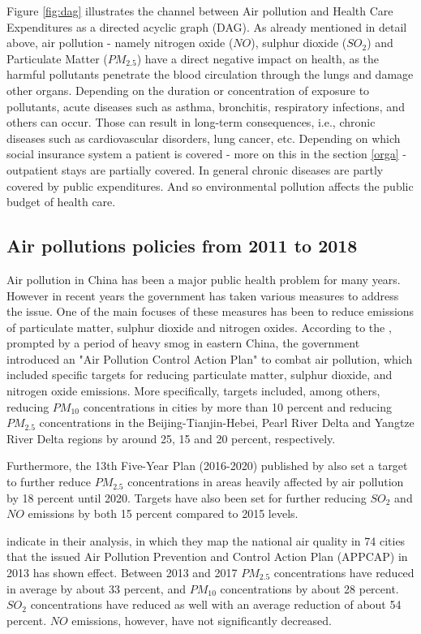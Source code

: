 \documentclass[
]{article}
\begin{document}
Figure \ref{fig:dag} illustrates the channel between Air pollution and Health Care Expenditures as a directed acyclic graph (DAG). As already mentioned in detail above, air pollution - namely nitrogen oxide ($NO$), sulphur dioxide ($SO_2$) and Particulate Matter ($PM_{2.5}$) have a direct negative impact on health, as the harmful pollutants penetrate the blood circulation through the lungs and damage other organs. Depending on the duration or concentration of exposure to pollutants, acute diseases such as asthma, bronchitis, respiratory infections, and others can occur. Those can result in long-term consequences, i.e., chronic diseases such as cardiovascular disorders, lung cancer, etc.  
Depending on which social insurance system a patient is covered - more on this in the section \ref{orga} - outpatient stays are partially covered. In general chronic diseases are partly covered by public expenditures. And so environmental pollution affects the public budget of health care. 
	
	
	\subsection{Air pollutions policies from 2011 to 2018}
	
	Air pollution in China has been a major public health problem for many years. However in recent years the government has taken various measures to address the issue. One of the main focuses of these measures has been to reduce emissions of particulate matter, sulphur dioxide and nitrogen oxides. 
	According to the \cite{china2013}, prompted by a period of heavy smog in eastern China, the government introduced an "Air Pollution Control Action Plan" to combat air pollution, which included specific targets for reducing particulate matter, sulphur dioxide, and nitrogen oxide emissions. More specifically, targets included, among others, reducing $PM_{10}$ concentrations in cities by more than 10 percent and reducing $PM_{2.5}$ concentrations in the Beijing-Tianjin-Hebei, Pearl River Delta and Yangtze River Delta regions by  around 25, 15 and 20 percent, respectively. 
	
	Furthermore, the 13th Five-Year Plan (2016-2020) published by \cite{china2016} also set a target to further reduce $PM_{2.5}$ concentrations in areas heavily affected by air pollution by 18 percent until 2020. Targets have also been set for further reducing $SO_2$ and $NO$ emissions by both 15 percent compared to 2015 levels. 
	
	\cite{HUANG2018e313} indicate in their analysis, in which they map the national air quality in 74 cities that the issued Air Pollution Prevention and Control Action Plan (APPCAP) in 2013 has shown effect. Between 2013 and 2017 $PM_{2.5}$ concentrations have reduced in average by about 33 percent, and $PM_{10}$ concentrations by about 28 percent. $SO_2$ concentrations have reduced as well with an average reduction of about 54 percent. $NO$ emissions, however, have not significantly decreased. 
	
\end{document}
